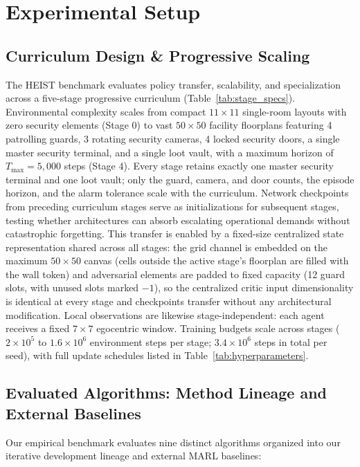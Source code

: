 \section{Experimental Setup}
\label{sec:setup}

\subsection{Curriculum Design \& Progressive Scaling}
The HEIST benchmark evaluates policy transfer, scalability, and specialization across a five-stage progressive curriculum (Table~\ref{tab:stage_specs}). Environmental complexity scales from compact $11 \times 11$ single-room layouts with zero security elements (Stage 0) to vast $50 \times 50$ facility floorplans featuring 4 patrolling guards, 3 rotating security cameras, 4 locked security doors, a single master security terminal, and a single loot vault, with a maximum horizon of $T_{\max} = 5,\!000$ steps (Stage 4). Every stage retains exactly one master security terminal and one loot vault; only the guard, camera, and door counts, the episode horizon, and the alarm tolerance scale with the curriculum. Network checkpoints from preceding curriculum stages serve as initializations for subsequent stages, testing whether architectures can absorb escalating operational demands without catastrophic forgetting. This transfer is enabled by a fixed-size centralized state representation shared across all stages: the grid channel is embedded on the maximum $50 \times 50$ canvas (cells outside the active stage's floorplan are filled with the wall token) and adversarial elements are padded to fixed capacity (12 guard slots, with unused slots marked $-1$), so the centralized critic input dimensionality is identical at every stage and checkpoints transfer without any architectural modification. Local observations are likewise stage-independent: each agent receives a fixed $7 \times 7$ egocentric window. Training budgets scale across stages ($2 \times 10^5$ to $1.6 \times 10^6$ environment steps per stage; $3.4 \times 10^6$ steps in total per seed), with full update schedules listed in Table~\ref{tab:hyperparameters}.



\subsection{Evaluated Algorithms: Method Lineage and External Baselines}
Our empirical benchmark evaluates nine distinct algorithms organized into our iterative development lineage and external MARL baselines:

